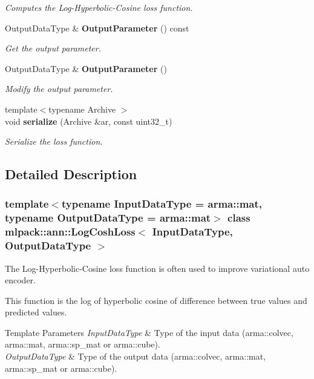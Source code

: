 \begin{DoxyCompactItemize}
\begin{DoxyCompactList}\small\item\em Computes the Log-\/\+Hyperbolic-\/\+Cosine loss function. \end{DoxyCompactList}\item 
Output\+Data\+Type \& \textbf{ Output\+Parameter} () const
\begin{DoxyCompactList}\small\item\em Get the output parameter. \end{DoxyCompactList}\item 
Output\+Data\+Type \& \textbf{ Output\+Parameter} ()
\begin{DoxyCompactList}\small\item\em Modify the output parameter. \end{DoxyCompactList}\item 
{\footnotesize template$<$typename Archive $>$ }\\void \textbf{ serialize} (Archive \&ar, const uint32\+\_\+t)
\begin{DoxyCompactList}\small\item\em Serialize the loss function. \end{DoxyCompactList}\end{DoxyCompactItemize}


\subsection{Detailed Description}
\subsubsection*{template$<$typename Input\+Data\+Type = arma\+::mat, typename Output\+Data\+Type = arma\+::mat$>$\newline
class mlpack\+::ann\+::\+Log\+Cosh\+Loss$<$ Input\+Data\+Type, Output\+Data\+Type $>$}

The Log-\/\+Hyperbolic-\/\+Cosine loss function is often used to improve variational auto encoder. 

This function is the log of hyperbolic cosine of difference between true values and predicted values.


\begin{DoxyTemplParams}{Template Parameters}
{\em Input\+Data\+Type} & Type of the input data (arma\+::colvec, arma\+::mat, arma\+::sp\+\_\+mat or arma\+::cube). \\
\hline
{\em Output\+Data\+Type} & Type of the output data (arma\+::colvec, arma\+::mat, arma\+::sp\+\_\+mat or arma\+::cube). \\
\hline
\end{DoxyTemplParams}


